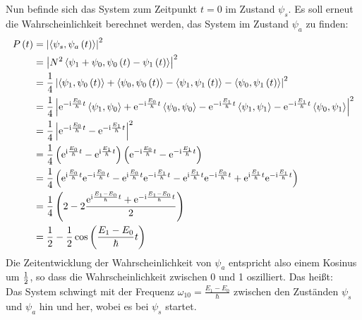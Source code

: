\documentclass[11pt, ngerman, fleqn, DIV=15, headinclude]{scrartcl}
\begin{document}
Nun befinde sich das System zum Zeitpunkt $t=0$ im Zustand $\psi_s$. Es soll erneut die Wahrscheinlichkeit berechnet werden, das System im Zustand $\psi_a$ zu finden:
\begin{align*}
	P\left( t \right)	&= \left| \left<\psi_s,\psi_a\left( t \right)\right> \right|^2\\
				&= \left| N^2\left<\psi_1+\psi_0,\psi_0\left( t \right)-\psi_1\left( t \right)\right> \right|^2\\
				&= \frac14\left| \left<\psi_1,\psi_0\left( t \right)\right> + \left<\psi_0,\psi_0\left( t \right)\right> - \left<\psi_1,\psi_1\left( t \right)\right> - \left<\psi_0,\psi_1\left( t \right)\right> \right|^2\\
				&= \frac14\left| \mathrm e^{-\mathrm i\frac{E_0}{\hbar}t}\left<\psi_1,\psi_0\right> + \mathrm e^{-\mathrm i\frac{E_0}{\hbar}t}\left<\psi_0,\psi_0\right> - \mathrm e^{-\mathrm i\frac{E_1}{\hbar}t}\left<\psi_1,\psi_1\right> - \mathrm e^{-\mathrm i\frac{E_1}{\hbar}t}\left<\psi_0,\psi_1\right> \right|^2\\
				&= \frac14\left| \mathrm e^{-\mathrm i\frac{E_0}{\hbar}t} - \mathrm e^{-\mathrm i\frac{E_1}{\hbar}t} \right|^2\\
				&= \frac14\left( \mathrm e^{\mathrm i\frac{E_0}{\hbar}t} - \mathrm e^{\mathrm i\frac{E_1}{\hbar}t} \right)\left( \mathrm e^{-\mathrm i\frac{E_0}{\hbar}t} - \mathrm e^{-\mathrm i\frac{E_1}{\hbar}t} \right)\\
				&= \frac14\left( \mathrm e^{\mathrm i\frac{E_0}{\hbar}t}\mathrm e^{-\mathrm i\frac{E_0}{\hbar}t} - \mathrm e^{\mathrm i\frac{E_0}{\hbar}t}\mathrm e^{-\mathrm i\frac{E_1}{\hbar}t} - \mathrm e^{\mathrm i\frac{E_1}{\hbar}t}\mathrm e^{-\mathrm i\frac{E_0}{\hbar}t} + \mathrm e^{\mathrm i\frac{E_1}{\hbar}t}\mathrm e^{-\mathrm i\frac{E_1}{\hbar}t} \right)\\
				&= \frac14\left( 2-2\frac{\mathrm e^{\mathrm i\frac{E_1-E_0}{\hbar}t}+\mathrm e^{-\mathrm i\frac{E_1-E_0}{\hbar}t}}{2} \right)\\
				&= \frac 12-\frac 12\cos\left( \frac{E_1-E_0}{\hbar}t \right)
\end{align*}
Die Zeitentwicklung der Wahrscheinlichkeit von $\psi_a$ entspricht also einem Kosinus um $\frac 12$, so dass die Wahrscheinlichkeit zwischen 0 und 1 oszilliert. Das heißt:\\
Das System schwingt mit der Frequenz $\omega_{10}=\frac{E_1-E_0}{\hbar}$ zwischen den Zuständen $\psi_s$ und $\psi_a$ hin und her, wobei es bei $\psi_s$ startet.\\
\end{document}
